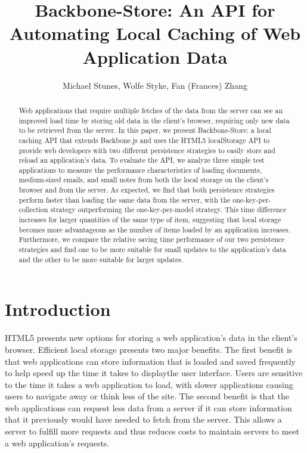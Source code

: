 \documentclass[12pt]{article}
\title{Backbone-Store: An API for Automating Local Caching of Web Application
Data}
\author{Michael Stunes, Wolfe Styke, Fan (Frances) Zhang}
\begin{document}
\maketitle

\begin{abstract}
Web applications that require multiple fetches of the data from the server
can see an improved load time by storing old data in the client's browser,
requiring only new data to be retrieved from the server. In this paper, we present Backbone-Store: a local caching API that extends Backbone.js and uses the HTML5 localStorage API to provide web developers with two different persistence strategies to easily store and reload an application's data. To evaluate the API,  we analyze three simple test applications to measure the performance characteristics of loading documents, medium-sized emails, and small notes from both the local storage on the client's browser and from the server. As expected, we find that both persistence strategies perform faster than loading the same data from the server, with the one-key-per-collection strategy outperforming the one-key-per-model strategy. This time difference increases for larger quantities of the same type of item, suggesting that local storage becomes more advantageous as the number of items loaded by an application increases. Furthermore, we compare the relative saving time performance of our two persistence strategies and find one to be more suitable for small updates to the application's data and the other to be more suitable for larger updates.
\end{abstract}

\section{Introduction}

HTML5 presents new options for storing a web application's data in the client's
browser. Efficient local storage presents two major
benefits. The first benefit is that web applications can store information that is loaded and saved
frequently to help speed up the time it takes to displaythe user
interface. Users are sensitive to the time it takes a
web application to load, with slower applications causing users to navigate
away or think less of the site. The second benefit is that the web applications
can request less data from a server if it can store information that it
previously would have needed to fetch from the server. This allows a server to
fulfill more requests and thus reduces costs to maintain servers to meet a web
application's requests.
\end{document}
